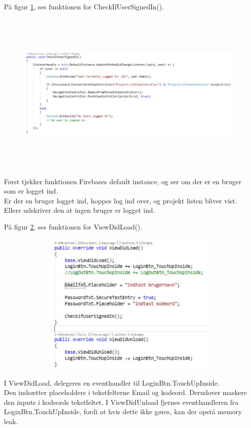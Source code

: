 På figur \ref{fig:Checkifusersigned}, ses funktionen for CheckIfUserSignedIn().
\begin{figure}[H] %
	\centering
	\includegraphics[height=8cm, width=15cm]{../ArkitekturDesign/Design/Login/Checkifusersigned}
	\caption{}
	\label{fig:Checkifusersigned}
\end{figure}
Først tjekker funktionen Firebases default instance, og ser om der er en bruger som er logget ind. \\
Er der en bruger logget ind, hoppes log ind over, og projekt listen bliver vist. \\
Ellers udskriver den at ingen bruger er logget ind.

På figur \ref{fig:ViewDidLoad}, ses funktionen for ViewDidLoad().
\begin{figure}[H] %
	\centering
	\includegraphics[height=7cm, width=12cm]{../ArkitekturDesign/Design/Login/ViewDidLoad}
	\caption{}
	\label{fig:ViewDidLoad}
\end{figure}

\clearpage

I ViewDidLoad, delegeres en eventhandler til LoginBtn.TouchUpInside. \\
Den indsætter placeholders i tekstfelterne Email og kodeord. Derudover maskere den inputs i kodeords tekstfeltet.
I ViewDidUnload fjernes eventhandleren fra LoginBtn.TouchUpInside, fordi at hvis dette ikke gøres, kan der opstå memory leak. \\

